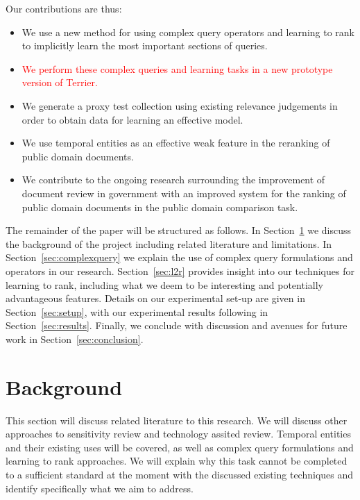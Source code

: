 \documentclass{mpaper}
\newcommand{\remove}[1]{\textcolor{red}{#1}}
\begin{document}
Our contributions are thus:
\begin{itemize}
\item We use a  new method for using complex query operators and learning to rank to implicitly learn the most important sections of queries.
\item \remove{We perform these complex queries and learning tasks in a new prototype version of Terrier.}
\item We generate a proxy test collection using existing relevance judgements in order to obtain data for learning an effective model.
\item We use temporal entities as an effective weak feature in the reranking of public domain documents. %
\item We contribute to the ongoing research surrounding the improvement of document review in government with an improved system for the ranking of public domain documents in the public domain comparison task.
\end{itemize}

The remainder of the paper will be structured as follows.
In Section~\ref{sec:background} we discuss the background of the project including related literature and limitations.
In Section~\ref{sec:complexquery} we explain the use of complex query formulations and operators in our research.
Section~\ref{sec:l2r} provides insight into our techniques for learning to rank, including what we deem to be interesting and potentially advantageous features.
Details on our experimental set-up are given in Section~\ref{sec:setup}, with our experimental results following in Section~\ref{sec:results}.
Finally, we conclude with discussion and avenues for future work in Section~\ref{sec:conclusion}.

\section{Background} \label{sec:background}
This section will discuss related literature to this research. We will discuss other approaches to sensitivity review and technology assited review. Temporal entities and their existing uses will be covered, as well as complex query formulations and learning to rank approaches. We will explain why this task cannot be completed to a sufficient standard at the moment with the discussed existing techniques and identify specifically what we aim to address.
\end{document}
